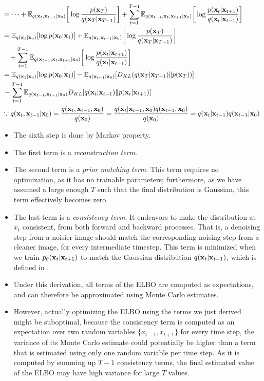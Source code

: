 \begin{align}
	&= \dots + \mathbb{E}_{q({\mathbf{x}}_{t}, {\mathbf{x}}_{t-1}|{\mathbf{x}}_0)}\bigg[\log \frac{p({\mathbf{x}}_T)}{q({\mathbf{x}}_T|{\mathbf{x}}_{T-1})}\bigg] + \sum_{t=1}^{T-1}\mathbb{E}_{q({\mathbf{x}}_{t-1},{\mathbf{x}}_t,{\mathbf{x}}_{t+1}|{\mathbf{x}}_0)}\bigg[\log \frac{ p({\mathbf{x}}_{t}|{\mathbf{x}}_{t+1})}{q({\mathbf{x}}_{t}|{\mathbf{x}}_{t-1})}\bigg]\\
	&= \mathbb{E}_{q({\mathbf{x}}_{1}|{\mathbf{x}}_0)}[\log p({\mathbf{x}}_0|{\mathbf{x}}_{1})] + \mathbb{E}_{q({\mathbf{x}}_{t}, {\mathbf{x}}_{t-1}|{\mathbf{x}}_0)}\bigg[\log \frac{p({\mathbf{x}}_T)}{q({\mathbf{x}}_T|{\mathbf{x}}_{T-1})}\bigg]\\ 
	&\quad+ \sum_{t=1}^{T-1}\mathbb{E}_{q({\mathbf{x}}_{t-1},{\mathbf{x}}_t,{\mathbf{x}}_{t+1}|{\mathbf{x}}_0)}\bigg[\log \frac{ p({\mathbf{x}}_{t}|{\mathbf{x}}_{t+1})}{q({\mathbf{x}}_{t}|{\mathbf{x}}_{t-1})}\bigg]\\
	&= \mathbb{E}_{q({\mathbf{x}}_{1}|{\mathbf{x}}_0)}[\log p({\mathbf{x}}_0|{\mathbf{x}}_{1})] - \mathbb{E}_{q({\mathbf{x}}_{t-1}|{\mathbf{x}}_0)}[D_{KL}(q({\mathbf{x}}_T|{\mathbf{x}}_{T-1})\| p({\mathbf{x}}_T))]\\
	&\,- \sum_{t=1}^{T-1} \mathbb{E}_{q({\mathbf{x}}_{t-1},{\mathbf{x}}_{t+1}|{\mathbf{x}}_0)}D_{KL}[q({\mathbf{x}}_{t}|{\mathbf{x}}_{t-1})\|p({\mathbf{x}}_{t}|{\mathbf{x}}_{t+1})]\\
	& \because q({\mathbf{x}}_{t}, {\mathbf{x}}_{t-1}|{\mathbf{x}}_0) = \frac{q({\mathbf{x}}_{t}, {\mathbf{x}}_{t-1},{\mathbf{x}}_0)}{q({\mathbf{x}}_0)} = \frac{q({\mathbf{x}}_{t}|{\mathbf{x}}_{t-1}, {\mathbf{x}}_0)q({\mathbf{x}}_{t-1}, {\mathbf{x}}_0)}{q({\mathbf{x}}_0)} = q({\mathbf{x}}_{t}|{\mathbf{x}}_{t-1})q({\mathbf{x}}_{t-1}|{\mathbf{x}}_0)
	\label{eq:diffusion_mle}
\end{align}
\begin{itemize}
	\item The sixth step is done by Markov property.
	\item The first term is a \textit{reconstruction term}. 
	\item The second term is a \textit{prior matching term}. This term requires no optimization, as it has no trainable parameters; furthermore, as we have assumed a large enough $T$ such that the final distribution is Gaussian, this term effectively becomes zero.
	\item The last term is a \textit{consistency term}. It endeavors to make the distribution at $x_t$ consistent, from both forward and backward processes. That is, a denoising step from a noisier image should match the corresponding noising step from a cleaner image, for every intermediate timestep.  This term is minimized when we train $p_\theta({\mathbf{x}}_t|{\mathbf{x}}_{t+1})$ to match the Gaussian distribution $q({\mathbf{x}}_t|{\mathbf{x}}_{t-1})$, which is defined in . 
	\item Under this derivation, all terms of the ELBO are computed as expectations, and can therefore be approximated using Monte Carlo estimates. 
	\item However, actually optimizing the ELBO using the terms we just derived might be suboptimal, because the consistency term is computed as an expectation over two random variables $\{x_{t-1}, x_{t+1}\}$ for every time step, the variance of its Monte Carlo estimate could potentially be higher than a term that is estimated using only one random variable per time step. As it is computed by summing up $T-1$ consistency terms, the final estimated value of the ELBO may have high variance for large $T$ values.
\end{itemize}

